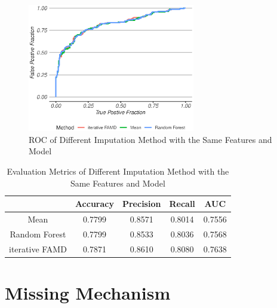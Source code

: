 \documentclass[a4paper,12pt,authoryear]{elegantpaper}
\begin{document}
    \begin{figure}[!hbt]
        \centering
        \includegraphics[width=0.65\textwidth]{./figures/titanic_roc.eps}
        \caption{ROC of Different Imputation Method with the Same Features and Model}
        \label{figure:titanic_roc}
    \end{figure}

    \begin{table}[!hbt]
        \centering
        \caption{Evaluation Metrics of Different Imputation Method with the Same Features and Model}
        \label{table:titanic_metrics}
        \begin{tabular}{@{}ccccc@{}}
        \toprule
                       & Accuracy & Precision & Recall & AUC    \\\midrule 
        Mean           & 0.7799   & 0.8571    & 0.8014 & 0.7556 \\
        Random Forest  & 0.7799   & 0.8533    & 0.8036 & 0.7568 \\
        iterative FAMD & 0.7871   & 0.8610    & 0.8080 & 0.7638 \\\bottomrule
        \end{tabular}
    \end{table}



    \section{Missing Mechanism}
\end{document}
